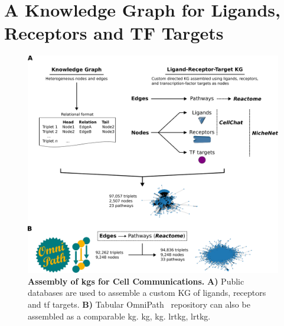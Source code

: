 


\section{A Knowledge Graph for Ligands, Receptors and TF Targets}

\begin{figure}
    \centering
    \includegraphics{06kg/figs/6KG_kg.png}
    \caption{\textbf{Assembly of \acrshort{kg}s for Cell Communications.} \textbf{A)} Public databases are used to assemble a custom KG of ligands, receptors and \acrshort{tf} targets. \textbf{B)} Tabular OmniPath~\cite{turei_integrated_2021} repository can also be assembled as a comparable \acrshort{kg}. \acrshort{kg}, \acrlong{kg}. \acrshort{lrtkg}, \acrlong{lrtkg}.}
    \label{fig:6kg}
\end{figure}

